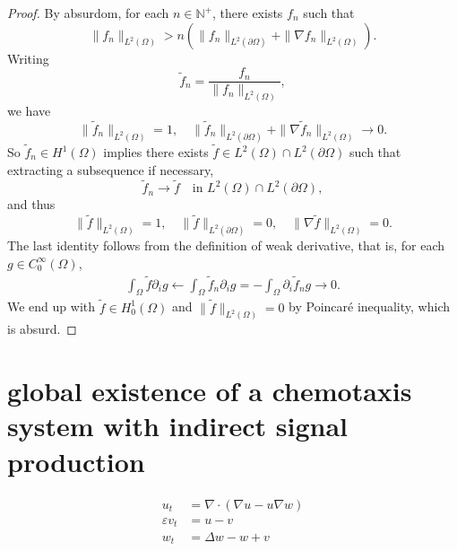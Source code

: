 \begin{proof}
	By absurdom, for each $n\in \mathbb{N}^+$, there exists $f_n$ such that
	\[
	\|f_n\|_{L^{2}(\Omega)} > n (\|f_n\|_{L^2(\partial\Omega)} + \|\nabla f_n\|_{L^2(\Omega)}).
	\]
	Writing
	\[
	\tilde{f}_n = \frac{f_n}{\|f_n\|_{L^2(\Omega)}},
	\]
	we have 
	\[
	\|\tilde f_n\|_{L^{2}(\Omega)} = 1,
	\quad \|\tilde f_n\|_{L^2(\partial\Omega)} + \|\nabla \tilde f_n\|_{L^2(\Omega)} \to 0.
	\]
	So $\tilde f_n\in H^1(\Omega)$ implies there exists $\tilde f\in L^2(\Omega)\cap L^2(\partial\Omega)$ such that extracting a subsequence if necessary,
	\[
	\tilde f_n\to \tilde f \quad\text{in } L^2(\Omega)\cap L^2(\partial\Omega),
	\]
	and thus 
	\[
	\|\tilde f\|_{L^2(\Omega)} = 1,
	\quad \|\tilde f\|_{L^2(\partial\Omega)} = 0,
	\quad \|\nabla\tilde f\|_{L^2(\Omega)} = 0.
	\]
	The last identity follows from the definition of weak derivative, that is,
	for each $g\in C^\infty_0(\Omega)$,
	\begin{align*}
		\int_\Omega \tilde f\partial_i g \leftarrow \int_\Omega \tilde f_n\partial_i g 
		= - \int_\Omega \partial_i \tilde f_n g \to 0. 
	\end{align*}
	We end up with $\tilde f\in H^1_0(\Omega)$ and $\|\tilde f\|_{L^2(\Omega)} = 0$ by Poincar\'e inequality,
	which is absurd.
\end{proof}


\section{global existence of a chemotaxis system with indirect signal production}
\begin{align}\label{sys: ks with isp}
  u_t &= \nabla\cdot(\nabla u - u\nabla w) \\
  \varepsilon v_t &= u - v \\
  w_t &= \Delta w - w + v
\end{align}

